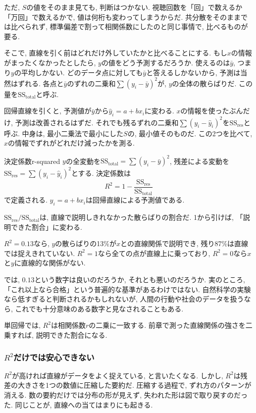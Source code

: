 ただ, $S$の値をそのまま見ても, 判断はつかない.
視聴回数を「回」で数えるか「万回」で数えるかで, 値は何桁も変わってしまうからだ.
共分散をそのままでは比べられず, 標準偏差で割って相関係数にしたのと同じ事情で, 比べるものが要る.

そこで, 直線を引く前はどれだけ外していたかと比べることにする.
もし$x$の情報がまったくなかったとしたら, $y$の値をどう予測するだろうか.
使えるのは$\bar{y}$, つまり$y$の平均しかない.
どのデータ点に対しても$\bar{y}$と答えるしかないから, 予測は当然はずれる.
各点と$\bar{y}$のずれの二乗和$\sum(y_i - \bar{y})^2$が, $y$の全体の散らばりだ.
この量を$\mathrm{SS_{total}}$と呼ぶ.

回帰直線を引くと, 予測値が$\bar{y}$から$\hat{y}_i = a + bx_i$に変わる.
$x$の情報を使ったぶんだけ, 予測は改善されるはずだ.
それでも残るずれの二乗和$\sum(y_i - \hat{y}_i)^2$を$\mathrm{SS_{res}}$と呼ぶ.
中身は, 最小二乗法で最小にした$S$の, 最小値そのものだ.
この2つを比べて, $x$の情報でずれがどれだけ減ったかを測る.

\begin{defi}{決定係数}{r-squared}
$y$の全変動を$\mathrm{SS_{total}} = \sum(y_i - \bar{y})^2$, 残差による変動を$\mathrm{SS_{res}} = \sum(y_i - \hat{y}_i)^2$とする.
決定係数は
\[
  R^2 = 1 - \frac{\mathrm{SS_{res}}}{\mathrm{SS_{total}}}
\]
で定義される. $\hat{y}_i = a + bx_i$は回帰直線による予測値である.
\end{defi}

$\mathrm{SS_{res}} / \mathrm{SS_{total}}$は, 直線で説明しきれなかった散らばりの割合だ.
1から引けば, 「説明できた割合」に変わる.

$R^2 = 0.13$なら, $y$の散らばりの13\%が$x$との直線関係で説明でき, 残り87\%は直線では捉えきれていない.
$R^2 = 1$なら全ての点が直線上に乗っており, $R^2 = 0$なら$x$と$y$に直線的な関係がない.

では, $0.13$という数字は良いのだろうか, それとも悪いのだろうか.
実のところ, 「これ以上なら合格」という普遍的な基準があるわけではない.
自然科学の実験なら低すぎると判断されるかもしれないが, 人間の行動や社会のデータを扱うなら, これでも十分意味のある数字と見なされることもある.

単回帰では, $R^2$は相関係数$r$の二乗に一致する.
前章で測った直線関係の強さを二乗すれば, 説明できた割合になる.

\subsubsection*{\texorpdfstring{$R^2$}{R²}だけでは安心できない}

$R^2$が高ければ直線がデータをよく捉えている, と言いたくなる.
しかし, $R^2$は残差の大きさを1つの数値に圧縮した要約だ.
圧縮する過程で, ずれ方のパターンが消える.
数の要約だけでは分布の形が見えず, 失われた形は図で取り戻すのだった.
同じことが, 直線への当てはまりにも起きる.

